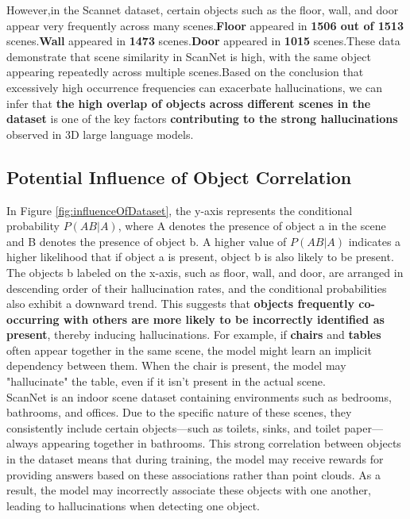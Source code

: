 However,in the Scannet dataset, certain objects such as the floor, wall, and door appear very frequently across many scenes.\textbf{Floor} appeared in \textbf{1506 out of 1513} scenes.\textbf{Wall} appeared in \textbf{1473} scenes.\textbf{Door} appeared in \textbf{1015} scenes.These data demonstrate that scene similarity in ScanNet is high, with the same object appearing repeatedly across multiple scenes.Based on the conclusion that excessively high occurrence frequencies can exacerbate hallucinations, we can infer that \textbf{the high overlap of objects across different scenes in the dataset} is one of the key factors \textbf{contributing to the strong hallucinations} observed in 3D large language models.
\subsection{Potential Influence of Object Correlation}
 In Figure \ref{fig:influenceOfDataset}, the y-axis represents the conditional probability \( P(AB|A) \), where A denotes the presence of object a in the scene and B denotes the presence of object b. A higher value of \( P(AB|A) \) indicates a higher likelihood that if object a is present, object b is also likely to be present. The objects b labeled on the x-axis, such as floor, wall, and door, are arranged in descending order of their hallucination rates, and the conditional probabilities also exhibit a downward trend. This suggests that \textbf{objects frequently co-occurring with others are more likely to be incorrectly identified as present}, thereby inducing hallucinations. For example, if \textbf{chairs} and \textbf{tables} often appear together in the same scene, the model might learn an implicit dependency between them. When the chair is present, the model may "hallucinate" the table, even if it isn't present in the actual scene.\\
 ScanNet is an indoor scene dataset containing environments such as bedrooms, bathrooms, and offices. Due to the specific nature of these scenes, they consistently include certain objects—such as toilets, sinks, and toilet paper—always appearing together in bathrooms. This strong correlation between objects in the dataset means that during training, the model may receive rewards for providing answers based on these associations rather than point clouds. As a result, the model may incorrectly associate these objects with one another, leading to hallucinations when detecting one object.

